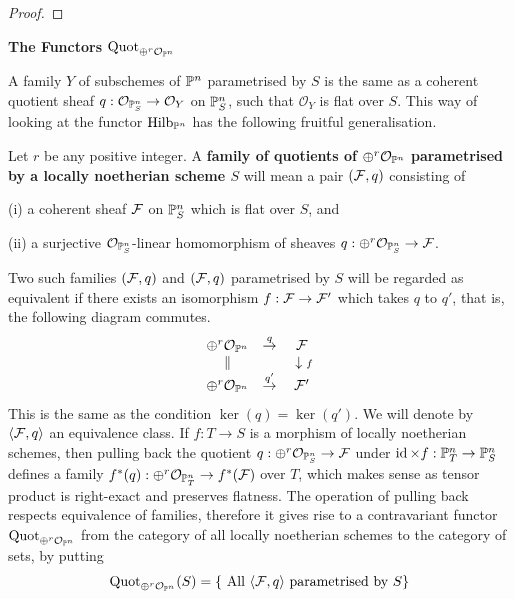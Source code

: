 \begin{proof}
\notready
\end{proof}





\medskip


\bigskip


\centerline{\large\bf The Functors $\operatorname{Quot}_{\oplus^r {\mathcal O}_{\mathbb{P}^n}}$}
\nopagebreak
\medskip
\nopagebreak
A family $Y$ of subschemes of $\mathbb{P}^n$ parametrised by $S$
is the same as
a coherent quotient sheaf $q: {\mathcal O}_{\mathbb{P}^n_S} \to {\mathcal O}_Y$ on
$\mathbb{P}^n_S$, such that ${\mathcal O}_Y$ is flat over $S$.
This way of looking at the functor $\operatorname{Hilb}_{\mathbb{P}^n}$
has the following fruitful generalisation.


\begin{definition}\label{nhq-projective-quot-family}
Let $r$ be any positive integer.
A \textbf{family of quotients of $\oplus^r {\mathcal O}_{\mathbb{P}^n}$
parametrised by a locally noetherian scheme $S$} will mean
a pair $(\mathcal{F},q)$ consisting of

(i) a coherent sheaf $\mathcal{F}$ on $\mathbb{P}^n_S$ which is flat over $S$, and

(ii) a surjective ${\mathcal O}_{\mathbb{P}^n_S}$-linear homomorphism of sheaves
$q:\oplus^r {\mathcal O}_{\mathbb{P}^n_S}  \to \mathcal{F}$.

Two such families $(\mathcal{F},q)$ and $(\mathcal{F},q)$ parametrised by $S$ will
be regarded as equivalent if there exists an isomorphism $f: \mathcal{F} \to \mathcal{F}'$
which takes $q$ to $q'$, that is, the following diagram commutes.
$$\begin{array}{ccc}
\oplus^r {\mathcal O}_{\mathbb{P}^n} &\stackrel{q}{\to} & \mathcal{F} \\
\|                  &     & ~ \downarrow {\scriptstyle f} \\
\oplus^r {\mathcal O}_{\mathbb{P}^n} &\stackrel{q'}{\to} & \mathcal{F}'
\end{array}$$
This is the same as the condition
$\ker(q) = \ker(q')$. We will denote by $\langle \mathcal{F}, q \rangle$
an equivalence class. If $f : T\to S$ is a morphism of
locally noetherian schemes, then pulling back the quotient
$q: \oplus^r{\mathcal O}_{\mathbb{P}^n_S} \to \mathcal{F}$
under $\operatorname{id}\times f : \mathbb{P}^n_T \to \mathbb{P}^n_S$
defines a family $f^*(q) : \oplus^r {\mathcal O}_{\mathbb{P}^n_T} \to f^*(\mathcal{F})$ over $T$,
which makes sense as tensor product is right-exact and preserves flatness.
The operation of pulling back respects equivalence of families,
therefore it gives rise to a contravariant functor
$\operatorname{Quot}_{\oplus^r {\mathcal O}_{\mathbb{P}^n}}$ from the category of
all locally noetherian schemes to the category of sets,
by putting
$$\operatorname{Quot}_{\oplus^r {\mathcal O}_{\mathbb{P}^n}}(S) =
\{\mbox{ All } \langle \mathcal{F}, q \rangle \mbox{ parametrised by }S\}$$
\end{definition}


